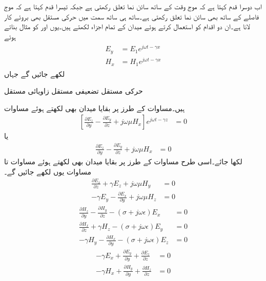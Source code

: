 اب دوسرا قدم کہتا ہے کہ موج وقت کے ساتھ سائن نما تعلق رکھتی ہے جبکہ تیسرا قدم کہتا ہے کہ موج  فاصلے کے ساتھ بھی سائن نما تعلق رکھتی ہے۔ساتھ ہی ساتھ  سمت میں حرکی مستقل بھی بروئے کار لانا ہے۔ان دو اقدام کو استعمال کرتے ہوئے میدان کے تمام اجزاء لکھتے ہیں۔یوں  اور  کو مثال بناتے ہوئے
\begin{gather}
\begin{aligned}\label{مساوات_مویج_سائن_نما_کی_قید}
E_y&=E_1 e^{j \omega t -\gamma x} \\
H_x&=H_1 e^{j \omega t -\gamma x}
\end{aligned}
\end{gather}
لکھے جائیں گے جہاں
\begin{description}
 حرکی مستقل 
 تضعیفی مستقل
 زاویائی مستقل
\end{description}
ہیں۔مساوات  کے طرز پر بقایا میدان بھی لکھتے ہوئے مساوات 
\begin{align*}
\left[\frac{\partial E_z}{\partial y}-\frac{\partial E_y}{\partial z}+j \omega \mu H_x\right] e^{j \omega t -\gamma z}&=0  
\end{align*}
یا
\begin{align}
\frac{\partial E_z}{\partial y}-\frac{\partial E_y}{\partial z}+j \omega \mu H_x&=0  
\end{align}
لکھا جائے۔اسی طرح مساوات  کے طرز پر بقایا میدان بھی لکھتے ہوئے مساوات   تا مساوات  یوں لکھے جائیں گے۔
\begin{align}
\frac{\partial E_x}{\partial z}+\gamma E_z+j \omega \mu H_y&=0  \\
-\gamma E_y-\frac{\partial E_x}{\partial y}+j \omega \mu H_z&=0
\end{align}
%
\begin{align}
\frac{\partial H_z}{\partial y}-\frac{\partial H_y}{\partial z}-(\sigma+j \omega \epsilon)E_x&=0 \\
\frac{\partial H_x}{\partial z}+\gamma H_z-(\sigma+j \omega \epsilon)E_y&=0  \\
-\gamma H_y-\frac{\partial H_x}{\partial y}-(\sigma+j \omega \epsilon)E_z&=0 
\end{align}
%
\begin{align}
-\gamma E_x+\frac{\partial E_y}{\partial y}+\frac{\partial E_z}{\partial z}&=0 \\
-\gamma H_x+\frac{\partial H_y}{\partial y}+\frac{\partial H_z}{\partial z}&=0
\end{align}
